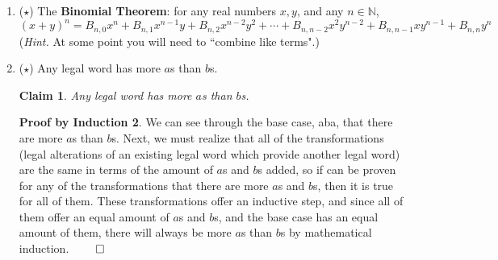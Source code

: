 \documentclass[11pt]{letter}
\newtheorem{claim}{Claim}
\theoremstyle{definition}
\newtheorem{PBI}{Proof by Induction}
\begin{document}
\begin{description}
\begin{enumerate}
\begin{PBI}
                            \begin{align*}
                              \frac{d^{k+1}}{dx^{k+1}}f+\frac{d^{k+1}}{dx^{k+1}}g &= \frac{d^{k+1}}{dx^{k+1}}[f+g] \\
                              &=\frac{d}{dx}\frac{d^k}{dx^k}[f+g] \\
                              &=\frac{d}{dx}\frac{d^k}{dx^k}f+\frac{d}{dx^k}g \tag{Substituted with equation given in claim}\\
                              &=\frac{d^{k+1}}{dx^{k+1}}f+\frac{d^{k+1}}{dx^{k+1}}g \\
                              \end{align*}
                            Therefore, since $\frac{d^n}{dx^n}\left[f+g\right]=\frac{d^n}{dx^n}f+\frac{d^n}{dx^n}g$ is true in the base case of n=1 and for n+1, through mathematical induction this is true. $\qed$


                          \end{PBI}
			\item ($\star$) The {\bfseries Binomial Theorem}: for any real numbers $x,y$, and any $n\in\mathbb{N}$,
				\begin{equation*}
					(x+y)^n=B_{n,0}x^n +B_{n,1}x^{n-1}y+B_{n,2}x^{n-2}y^2+\cdots+B_{n,n-2}x^2y^{n-2}+B_{n,n-1}x y^{n-1}+B_{n,n}y^n
				\end{equation*}
				({\em Hint.} At some point you will need to ``combine like terms".)
			\item ($\star$) Any legal word has more $a$s than $b$s.
\begin{claim}
Any legal word has more $a$s than $b$s.
\end{claim}
\begin{PBI}
We can see through the base case, aba, that there are more $a$s than $b$s. Next, we must realize that all of the transformations (legal alterations of an existing legal word which provide another legal word) are the same in terms of the amount of $a$s and $b$s added, so if can be proven for any of the transformations that there are more $a$s and $b$s, then it is true for all of them. These transformations offer an inductive step, and since all of them offer an equal amount of $a$s and $b$s, and the base case has an equal amount of them, there will always be more $a$s than $b$s by mathematical induction. $\qed$ 
\end{PBI}
			\end{enumerate}
\end{description}
\end{document}
